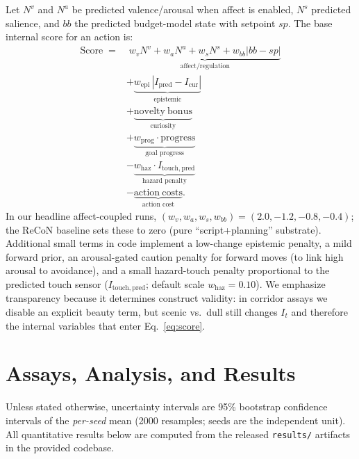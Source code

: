 \documentclass[letterpaper]{article} %
\begin{document}
Let $N^v$ and $N^a$ be predicted valence/arousal when affect is enabled, $N^s$ predicted salience, and $bb$ the predicted budget-model state with setpoint $sp$.
The base internal score for an action is:
\begin{equation}
\label{eq:score}
\begin{split}
\mathrm{Score} \;=&\;\underbrace{w_v N^v + w_a N^a + w_s N^s + w_{bb}|bb-sp|}_{\text{affect/regulation}}\\
&+\underbrace{w_{\mathrm{epi}}\,|I_{\mathrm{pred}}-I_{\mathrm{cur}}|}_{\text{epistemic}}\\
&+\underbrace{\mathrm{novelty\ bonus}}_{\text{curiosity}}\\
&+\underbrace{w_{\mathrm{prog}}\cdot\mathrm{progress}}_{\text{goal progress}}\\
&-\underbrace{w_{\mathrm{haz}}\cdot I_{\mathrm{touch,pred}}}_{\text{hazard penalty}}\\
&-\underbrace{\mathrm{action\ costs}}_{\text{action cost}}.
\end{split}
\end{equation}
In our headline affect-coupled runs, $(w_v,w_a,w_s,w_{bb})=(2.0,-1.2,-0.8,-0.4)$; the ReCoN baseline sets these to zero (pure ``script+planning'' substrate).
Additional small terms in code implement a low-change epistemic penalty, a mild forward prior, an arousal-gated caution penalty for forward moves (to link high arousal to avoidance), and a small hazard-touch penalty proportional to the predicted touch sensor ($I_{\mathrm{touch,pred}}$; default scale $w_{\mathrm{haz}}{=}0.10$).
We emphasize transparency because it determines construct validity: in corridor assays we disable an explicit beauty term, but scenic vs.\ dull still changes $I_t$ and therefore the internal variables that enter Eq.~\ref{eq:score}.


\section{Assays, Analysis, and Results}
Unless stated otherwise, uncertainty intervals are 95\% bootstrap confidence intervals of the \emph{per-seed} mean (2000 resamples; seeds are the independent unit).
All quantitative results below are computed from the released \texttt{results/} artifacts in the provided codebase.
\end{document}
